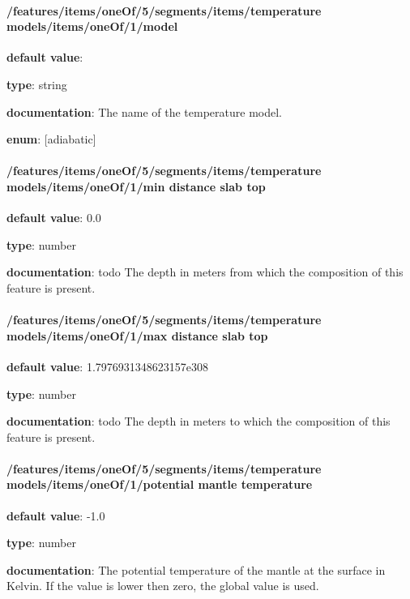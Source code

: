 \paragraph{/features/items/oneOf/5/segments/items/temperature models/items/oneOf/1/model} \begin{itemized}
\item {\bf default value}: 
\item {\bf type}: string
\item {\bf documentation}: The name of the temperature model.
\item {\bf enum}: [adiabatic]\end{itemized}\paragraph{/features/items/oneOf/5/segments/items/temperature models/items/oneOf/1/min distance slab top} \begin{itemized}
\item {\bf default value}: 0.0
\item {\bf type}: number
\item {\bf documentation}: todo The depth in meters from which the composition of this feature is present.
\end{itemized}\paragraph{/features/items/oneOf/5/segments/items/temperature models/items/oneOf/1/max distance slab top} \begin{itemized}
\item {\bf default value}: 1.7976931348623157e308
\item {\bf type}: number
\item {\bf documentation}: todo The depth in meters to which the composition of this feature is present.
\end{itemized}\paragraph{/features/items/oneOf/5/segments/items/temperature models/items/oneOf/1/potential mantle temperature} \begin{itemized}
\item {\bf default value}: -1.0
\item {\bf type}: number
\item {\bf documentation}: The potential temperature of the mantle at the surface in Kelvin. If the value is lower then zero, the global value is used.

\end{itemized}
